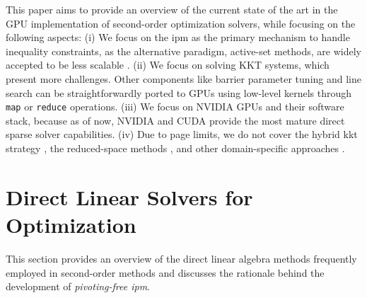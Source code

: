 \documentclass{article}
\begin{document}
This paper aims to provide an overview of the current state of the art in the GPU implementation of second-order optimization solvers, while focusing on the following aspects: (i) We focus on the \gls*{ipm} as the primary mechanism to handle inequality constraints, as the alternative paradigm, active-set methods, are widely accepted to be less scalable \cite{nocedalNumericalOptimization2006}. (ii) We focus on solving KKT systems, which present more challenges. Other components like barrier parameter tuning and line search can be straightforwardly ported to GPUs using low-level kernels through \texttt{map} or \texttt{reduce} operations. (iii) We focus on NVIDIA GPUs and their software stack, because as of now, NVIDIA and CUDA provide the most mature direct sparse solver capabilities. (iv) Due to page limits, we do not cover the hybrid \gls*{kkt} strategy \cite{regevHyKKTHybridDirectiterative2023}, the reduced-space methods \cite{pacaudAcceleratingCondensedInteriorPoint2023}, and other domain-specific approaches \cite{adabagMPCGPURealTimeNonlinear2024}.






\section{Direct Linear Solvers for Optimization}\label{eqn:linear}
This section provides an overview of the direct linear algebra methods frequently employed in second-order methods and discusses the rationale behind the development of \emph{pivoting-free \gls*{ipm}}.
\end{document}
